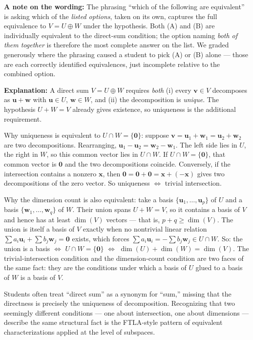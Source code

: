 \documentclass[12pt]{amsart}
\begin{document}
\textbf{A note on the wording:}
The phrasing ``which of the following are equivalent'' is asking which of the
\emph{listed options}, taken on its own, captures the full equivalence to
$V = U \oplus W$ under the hypothesis. Both (A) and (B) are individually
equivalent to the direct-sum condition; the option naming \emph{both of them
together} is therefore the most complete answer on the list. We graded
generously where the phrasing caused a student to pick (A) or (B) alone --- those
are each correctly identified equivalences, just incomplete relative to the
combined option.

\textbf{Explanation:}
A direct sum $V = U \oplus W$ requires \emph{both} (i) every $\mathbf{v} \in V$
decomposes as $\mathbf{u} + \mathbf{w}$ with $\mathbf{u} \in U$, $\mathbf{w} \in W$,
and (ii) the decomposition is \emph{unique}. The hypothesis $U + W = V$ already
gives existence, so uniqueness is the additional requirement.

Why uniqueness is equivalent to $U \cap W = \{\mathbf{0}\}$: suppose
$\mathbf{v} = \mathbf{u}_1 + \mathbf{w}_1 = \mathbf{u}_2 + \mathbf{w}_2$ are
two decompositions. Rearranging, $\mathbf{u}_1 - \mathbf{u}_2 = \mathbf{w}_2 - \mathbf{w}_1$.
The left side lies in $U$, the right in $W$, so this common vector lies in $U \cap W$.
If $U \cap W = \{\mathbf{0}\}$, that common vector is $\mathbf{0}$ and the two
decompositions coincide. Conversely, if the intersection contains a nonzero $\mathbf{x}$,
then $\mathbf{0} = \mathbf{0} + \mathbf{0} = \mathbf{x} + (-\mathbf{x})$ gives two
decompositions of the zero vector. So uniqueness $\Leftrightarrow$ trivial intersection.

Why the dimension count is also equivalent: take a basis $\{\mathbf{u}_1, \ldots, \mathbf{u}_p\}$
of $U$ and a basis $\{\mathbf{w}_1, \ldots, \mathbf{w}_q\}$ of $W$. Their union spans $U + W = V$,
so it contains a basis of $V$ and hence has at least $\dim(V)$ vectors --- that is,
$p + q \geq \dim(V)$. The union is itself a basis of $V$ exactly when no nontrivial
linear relation $\sum a_i \mathbf{u}_i + \sum b_j \mathbf{w}_j = \mathbf{0}$ exists,
which forces $\sum a_i \mathbf{u}_i = -\sum b_j \mathbf{w}_j \in U \cap W$. So:
the union is a basis $\Leftrightarrow$ $U \cap W = \{\mathbf{0}\}$ $\Leftrightarrow$
$\dim(U) + \dim(W) = \dim(V)$. The trivial-intersection condition and the
dimension-count condition are two faces of the same fact: they are the conditions
under which a basis of $U$ glued to a basis of $W$ is a basis of $V$.

Students often treat ``direct sum'' as a synonym for ``sum,'' missing that
the directness is precisely the uniqueness of decomposition. Recognizing that
two seemingly different conditions --- one about intersection, one about
dimensions --- describe the same structural fact is the FTLA-style pattern
of equivalent characterizations applied at the level of subspaces.
\end{document}
